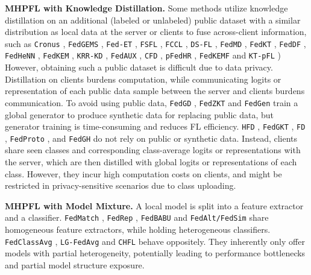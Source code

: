 \documentclass[sigconf]{acmart}
\newcommand{\hetero}{heterogeneous }
\newcommand{\homo}{homogeneous }
\begin{document}
\textbf{MHPFL with Knowledge Distillation.} 
Some methods utilize knowledge distillation on an additional (labeled or unlabeled) public dataset with a similar distribution as local data at the server or clients to fuse across-client information, such as 
{\tt{Cronus}} \citep{Cronus}, {\tt{FedGEMS}} \citep{FedGEMS}, {\tt{Fed-ET}} \citep{Fed-ET}, {\tt{FSFL}} \citep{FSFL}, {\tt{FCCL}} \citep{FCCL}, {\tt{DS-FL}} \citep{DS-FL}, {\tt{FedMD}} \citep{FedMD}, {\tt{FedKT}} \citep{FedKT}, {\tt{FedDF}} \citep{FedDF}, {\tt{FedHeNN}} \citep{FedHeNN}, {\tt{FedKEM}} \citep{FedKEM}, {\tt{KRR-KD}} \citep{KRR-KD}, {\tt{FedAUX}} \citep{FEDAUX}, {\tt{CFD}} \citep{CFD}, {\tt{pFedHR}} \citep{pFedHR}, {\tt{FedKEMF}} \citep{FedKEMF} and {\tt{KT-pFL}} \citep{KT-pFL}) 
However, obtaining such a public dataset is difficult due to data privacy. Distillation on clients burdens computation, while communicating logits or representation of each public data sample between the server and clients burdens communication. 
To avoid using public data, {\tt{FedGD}} \citep{FedGD}, {\tt{FedZKT}} \citep{FedZKT} and {\tt{FedGen}} \citep{FedGen} train a global generator to produce synthetic data for replacing public data, but generator training is time-consuming and reduces FL efficiency. {\tt{HFD}} \citep{HFD1,HFD2}, {\tt{FedGKT}} \citep{FedGKT}, {\tt{FD}} \citep{FD}, {\tt{FedProto}} \citep{FedProto}, and {\tt{FedGH}} \citep{FedGH} do not rely on public or synthetic data. Instead, clients share seen classes and corresponding class-average logits or representations with the server, which are then distilled with global logits or representations of each class. However, they incur high computation costs on clients, and might be restricted in privacy-sensitive scenarios due to class uploading.

\textbf{MHPFL with Model Mixture.} 
A local model is split into a feature extractor and a classifier. {\tt{FedMatch}} \citep{FedMatch}, {\tt{FedRep}} \citep{FedRep}, {\tt{FedBABU}} \citep{FedBABU} and {\tt{FedAlt/FedSim}} \citep{FedAlt/FedSim} share \homo feature extractors, while holding \hetero classifiers. {\tt{FedClassAvg}} \citep{FedClassAvg}, {\tt{LG-FedAvg}} \citep{LG-FedAvg} and {\tt{CHFL}} \citep{CHFL} behave oppositely. They inherently only offer models with partial heterogeneity, potentially leading to performance bottlenecks and partial model structure exposure.
\end{document}
